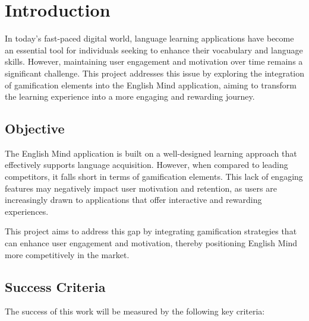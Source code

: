 \chapter{Introduction}

In today's fast-paced digital world, language learning applications have become an essential tool for individuals seeking to enhance their vocabulary and language skills. However, maintaining user engagement and motivation over time remains a significant challenge. This project addresses this issue by exploring the integration of gamification elements into the English Mind application, aiming to transform the learning experience into a more engaging and rewarding journey.

\section*{Objective}

The English Mind application is built on a well-designed learning approach that effectively supports language acquisition. However, when compared to leading competitors, it falls short in terms of gamification elements. This lack of engaging features may negatively impact user motivation and retention, as users are increasingly drawn to applications that offer interactive and rewarding experiences. 

This project aims to address this gap by integrating gamification strategies that can enhance user engagement and motivation, thereby positioning English Mind more competitively in the market.

\newpage

\section*{Success Criteria}

The success of this work will be measured by the following key criteria:


